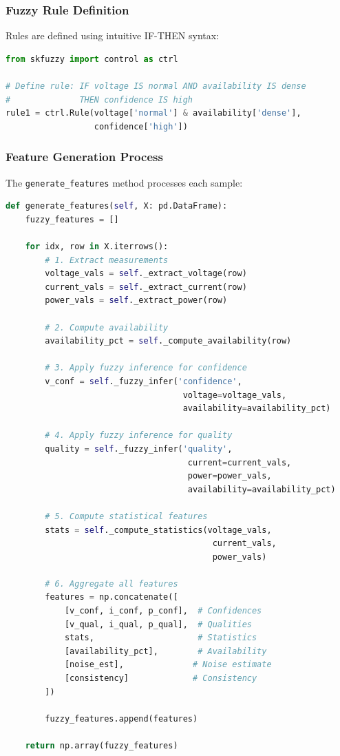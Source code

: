 \documentclass[12pt,a4paper]{report}
\begin{document}
\subsubsection{Fuzzy Rule Definition}

Rules are defined using intuitive IF-THEN syntax:

\begin{lstlisting}[language=Python, caption={Fuzzy Rule Example}]
from skfuzzy import control as ctrl

# Define rule: IF voltage IS normal AND availability IS dense 
#              THEN confidence IS high
rule1 = ctrl.Rule(voltage['normal'] & availability['dense'], 
                  confidence['high'])
\end{lstlisting}

\subsubsection{Feature Generation Process}

The \texttt{generate\_features} method processes each sample:

\begin{lstlisting}[language=Python, caption={Feature Generation Algorithm}]
def generate_features(self, X: pd.DataFrame):
    fuzzy_features = []
    
    for idx, row in X.iterrows():
        # 1. Extract measurements
        voltage_vals = self._extract_voltage(row)
        current_vals = self._extract_current(row)
        power_vals = self._extract_power(row)
        
        # 2. Compute availability
        availability_pct = self._compute_availability(row)
        
        # 3. Apply fuzzy inference for confidence
        v_conf = self._fuzzy_infer('confidence', 
                                    voltage=voltage_vals,
                                    availability=availability_pct)
        
        # 4. Apply fuzzy inference for quality
        quality = self._fuzzy_infer('quality',
                                     current=current_vals,
                                     power=power_vals,
                                     availability=availability_pct)
        
        # 5. Compute statistical features
        stats = self._compute_statistics(voltage_vals, 
                                          current_vals,
                                          power_vals)
        
        # 6. Aggregate all features
        features = np.concatenate([
            [v_conf, i_conf, p_conf],  # Confidences
            [v_qual, i_qual, p_qual],  # Qualities
            stats,                     # Statistics
            [availability_pct],        # Availability
            [noise_est],              # Noise estimate
            [consistency]             # Consistency
        ])
        
        fuzzy_features.append(features)
    
    return np.array(fuzzy_features)
\end{lstlisting}
\end{document}
